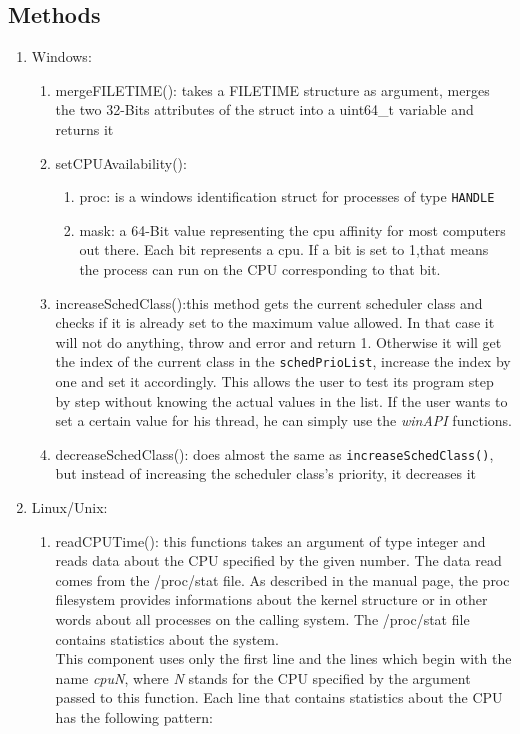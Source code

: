 \subsection{Methods}
\label{system-methods}
\begin{enumerate}
	\item Windows:
	\begin{enumerate}
		\item mergeFILETIME(): takes a FILETIME structure as argument, merges the two 32-Bits attributes of the struct into a uint64\_t variable and returns it
		\item setCPUAvailability():
		\begin{enumerate}
			\item proc: is a windows identification struct for processes of type \texttt{HANDLE}
			\item mask: a 64-Bit value representing the cpu affinity for most computers out there. Each bit represents a cpu. If a bit is set to 1,that means the process can run on the CPU corresponding to that bit.
		\end{enumerate}
		\item increaseSchedClass():this method gets the current scheduler class and checks if it is already set to the maximum value allowed. In that case it will not do anything, throw and error and return 1. Otherwise it will get the index of the current class in the \texttt{schedPrioList}, increase the index by one and set it accordingly. This allows the user to test its program step by step without knowing the actual values in the list. If the user wants to set a certain value for his thread, he can simply use the \textit{winAPI} functions.
		\item decreaseSchedClass(): does almost the same as \texttt{increaseSchedClass()}, but instead of increasing the scheduler class's priority, it decreases it
	\end{enumerate}
	\item Linux/Unix:
	\begin{enumerate}
		\item readCPUTime(): this functions takes an argument of type integer and reads data about the CPU specified by the given number. The data read comes from the \dq/proc/stat\dq{} file. As described in the manual page, the proc filesystem provides informations about the kernel structure or in other words about all processes on the calling system. The \dq/proc/stat\dq{} file contains statistics about the system.\\
		This component uses only the first line and the lines which begin with the name \textit{cpuN}, where \textit{N} stands for the CPU specified by the argument passed to this function. Each line that contains statistics about the CPU has the following pattern\cite{linux-man-proc}:

\end{enumerate}
\end{enumerate}

